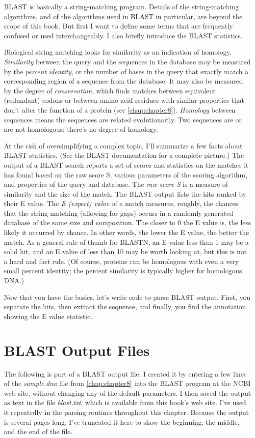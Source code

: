 BLAST is basically a string-matching program. Details of the string-matching algorithms, and of the algorithms used in BLAST in particular, are beyond the scope of this book. But first I want to define some terms that are frequently confused or used interchangeably. I also briefly introduce the BLAST statistics.

Biological string matching looks for similarity as an indication of homology. \textit{Similarity} between the query and the sequences in the database may be measured by the \textit{percent identity}, or the number of bases in the query that exactly match a corresponding region of a sequence from the database. It may also be measured by the degree of \textit{conservation}, which finds matches between equivalent (redundant) codons or between amino acid residues with similar properties that don't alter the function of a protein (see \autoref{chap:chapter8}). \textit{Homology} between sequences means the sequences are related evolutionarily. Two sequences are or are not homologous; there's no degree of homology.

At the risk of oversimplifying a complex topic, I'll summarize a few facts about BLAST statistics. (See the BLAST documentation for a complete picture.) The output of a BLAST search reports a set of scores and statistics on the matches it has found based on the raw score S, various parameters of the scoring algorithm, and properties of the query and database. The \textit{raw score S} is a measure of similarity and the size of the match. The BLAST output lists the hits ranked by their E value. The \textit{E (expect) value} of a match measures, roughly, the chances that the string matching (allowing for gaps) occurs in a randomly generated database of the same size and composition. The closer to 0 the E value is, the less likely it occurred by chance. In other words, the lower the E value, the better the match. As a general rule of thumb for BLASTN, an E value less than 1 may be a solid hit, and an E value of less than 10 may be worth looking at, but this is not a hard and fast rule. (Of course, proteins can be homologous with even a very small percent identity; the percent similarity is typically higher for homologous DNA.)

Now that you have the basics, let's write code to parse BLAST output. First, you separate the hits, then extract the sequence, and finally, you find the annotation showing the E value statistic. 

\section{BLAST Output Files}
\label{sect:section12.3}
The following is part of a BLAST output file. I created it by entering a few lines of the \textit{sample.dna} file from \autoref{chap:chapter8} into the BLAST program at the NCBI web site, without changing any of the default parameters. I then saved the output as text in the file \textit{blast.txt}, which is available from this book's web site. I've used it repeatedly in the parsing routines throughout this chapter. Because the output is several pages long, I've truncated it here to show the beginning, the middle, and the end of the file. 

